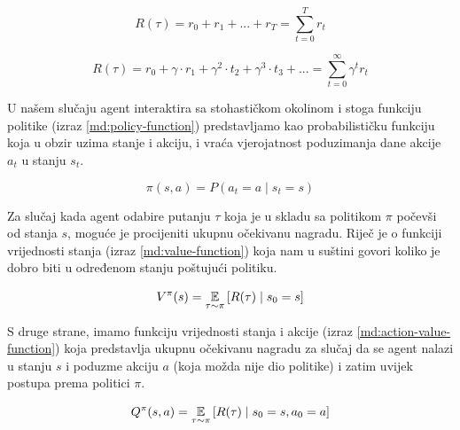 \begin{equation}
    \label{md:undiscounted-return}
    R(\tau) = r_0 + r_1 + ... + r_T = \sum_{t=0}^{T}r_t
\end{equation}

\begin{equation}
    \label{md:discounted-return}
    R(\tau) = r_0 + \gamma \cdot r_1 + \gamma^2 \cdot t_2 + \gamma^3 \cdot t_3 + ... = \sum_{t=0}^{\infty}\gamma^t r_t
\end{equation}

\bigskip

U našem slučaju agent interaktira sa stohastičkom okolinom i stoga funkciju politike  (izraz \ref{md:policy-function}) predstavljamo kao probabilističku funkciju koja u obzir uzima stanje i akciju, i vraća vjerojatnost poduzimanja dane akcije $a_t$ u stanju $s_t$.

\begin{equation}
    \label{md:policy-function}
    \pi(s, a) = P(a_t = a \mid s_t = s)
\end{equation}

\bigskip

Za slučaj kada agent odabire putanju $\tau$ koja je u skladu sa politikom $\pi$ počevši od stanja $s$, moguće je procijeniti ukupnu očekivanu nagradu. Riječ je o funkciji vrijednosti stanja  (izraz \ref{md:value-function}) koja nam u suštini govori koliko je dobro biti u određenom stanju poštujući politiku.

\begin{equation}
    \label{md:value-function}
    V^{\pi}(s) = \operatorname*{\mathbb{E}}_{\tau \sim \pi} \left[ {R(\tau) \mid s_0 = s} \right]
\end{equation}

\bigskip

S druge strane, imamo funkciju vrijednosti stanja i akcije  (izraz \ref{md:action-value-function}) koja predstavlja ukupnu očekivanu nagradu za slučaj da se agent nalazi u stanju $s$ i poduzme akciju $a$ (koja možda nije dio politike) i zatim uvijek postupa prema politici $\pi$.

\begin{equation}
    \label{md:action-value-function}
    Q^{\pi}(s,a) = \operatorname*{\mathbb{E}}_{\tau \sim \pi} \left[ {R(\tau) \mid s_0 = s, a_0 = a} \right]
\end{equation}

\bigskip


